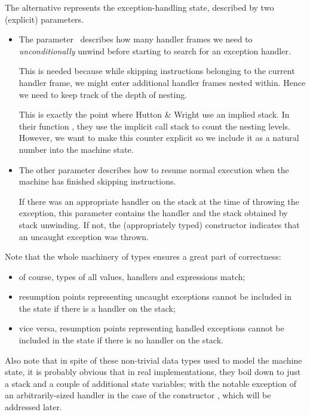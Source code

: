 The alternative \ident{$\times$[\_,\_]} represents the exception-handling state, described by
two (explicit) parameters.
\begin{itemize}
	\item The parameter~ describes how many handler frames we need to
		\emph{unconditionally} unwind before starting to search for an exception handler.
		
		This is needed because while skipping instructions belonging to the current
		handler frame, we might enter additional handler frames nested within. Hence
		we need to keep track of the depth of nesting.
		
		This is exactly the point where Hutton \& Wright use an implied stack.\cite[pg.~7]{gmh:exceptions}
		In their function , they use the implicit call stack to count
		the nesting levels. However, we want to make this counter explicit so we include
		it as a natural number into the machine state.
		
	\item The other parameter describes how to resume normal execution when
		the machine has finished skipping instructions.
		
		If there was an appropriate handler on the stack at the time of throwing
		the exception, this parameter contains the handler and the stack obtained
		by stack unwinding. If not, the (appropriately typed) constructor
		 indicates that an uncaught exception was thrown.
\end{itemize}

\noindent Note that the whole machinery of types ensures a great part of correctness:
\begin{itemize}
	\item of course, types of all values, handlers and expressions match;
	\item resumption points representing uncaught exceptions cannot be included in the state
		if there is a handler on the stack;
	\item vice versa, resumption points representing handled exceptions cannot be included
		in the state if there is no handler on the stack.
\end{itemize}

Also note that in spite of these non-trivial data types used to model the
machine state, it is probably obvious that in real implementations, they boil
down to just a stack and a couple of additional state variables; with the
notable exception of an arbitrarily-sized handler in the case of the
constructor , which will be addressed later.

